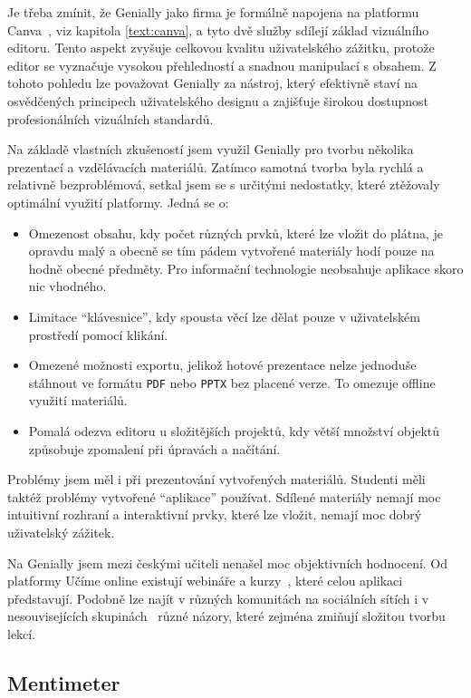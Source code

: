 Je třeba zmínit, že Genially jako firma je formálně napojena na platformu Canva~\cite{genially}, viz kapitola \ref{text:canva}, a tyto dvě služby sdílejí základ vizuálního editoru. 
Tento aspekt zvyšuje celkovou kvalitu uživatelského zážitku, protože editor se vyznačuje vysokou přehledností a snadnou manipulací s obsahem. 
Z tohoto pohledu lze považovat Genially za nástroj, který efektivně staví na osvědčených principech uživatelského designu a zajišťuje širokou dostupnost profesionálních vizuálních standardů.

Na základě vlastních zkušeností jsem využil Genially pro tvorbu několika prezentací a vzdělávacích materiálů. 
Zatímco samotná tvorba byla rychlá a relativně bezproblémová, setkal jsem se s určitými nedostatky, které ztěžovaly optimální využití platformy. 
Jedná se o:

\begin{itemize}
    \item Omezenost obsahu, kdy počet různých prvků, které lze vložit do plátna, je opravdu malý a obecně se tím pádem vytvořené materiály hodí pouze na hodně obecné předměty. Pro informační technologie neobsahuje aplikace skoro nic vhodného.  
    \item Limitace \enquote{klávesnice}, kdy spousta věcí lze dělat pouze v uživatelském prostředí pomocí klikání. 
    \item Omezené možnosti exportu, jelikož hotové prezentace nelze jednoduše stáhnout ve formátu \texttt{PDF} nebo \texttt{PPTX} bez placené verze. To omezuje offline využití materiálů.  
    \item Pomalá odezva editoru u složitějších projektů, kdy větší množství objektů způsobuje zpomalení při úpravách a načítání.  
\end{itemize}

Problémy jsem měl i při prezentování vytvořených materiálů. 
Studenti měli taktéž problémy vytvořené \enquote{aplikace} používat. 
Sdílené materiály nemají moc intuitivní rozhraní a interaktivní prvky, které lze vložit, nemají moc dobrý uživatelský zážitek.

Na Genially jsem mezi českými učiteli nenašel moc objektivních hodnocení.
Od platformy Učíme online existují webináře a kurzy~\cite{genially_ucimeonline}, které celou aplikaci představují.
Podobně lze najít v různých komunitách na sociálních sítích i v nesouvisejících skupinách~\cite{canva_facebook} různé názory, které zejména zmiňují složitou tvorbu lekcí.

\subsection{Mentimeter}

